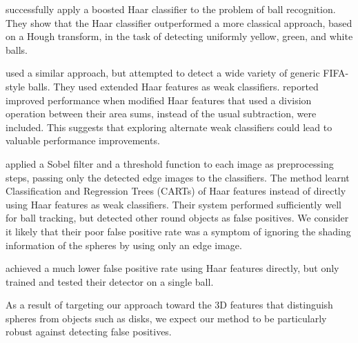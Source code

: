 \documentclass[11pt]{scrartcl}
\begin{document}
{        \citet{masselli2013haar} successfully apply a boosted Haar classifier
        \citep{viola2001robust} to the problem of ball recognition. They show
        that the Haar classifier outperformed a more classical approach, based on a
        Hough transform, in the task of detecting uniformly yellow, green, and white
        balls.

        \citet{zhang2013novel} used a similar approach, but attempted to
        detect a wide variety of generic FIFA-style balls. They used extended
        Haar features \citep{Lienhart2002extended} as weak classifiers.
        \citeauthor{zhang2013novel} reported improved performance when modified Haar
        features that used a division operation between their area sums, instead of
        the usual subtraction, were included. This suggests that exploring alternate
        weak classifiers could lead to valuable performance improvements.

        \citet{mitri2004fast} applied a Sobel filter and a threshold function
        to each image as preprocessing steps, passing only the detected edge
        images to the classifiers. The method learnt Classification and
        Regression Trees (CARTs) of Haar features instead of directly using
        Haar features as weak classifiers. Their system performed sufficiently
        well for ball tracking, but detected other round objects as false
        positives. We consider it likely that their poor false positive rate
        was a symptom of ignoring the shading information of the spheres by
        using only an edge image.


        \citet{Treptow2004filter} achieved a much lower false positive rate
        using Haar features directly, but only trained and tested their
        detector on a single ball.



        As a result of targeting our approach toward the 3D features that
        distinguish spheres from objects such as disks, we expect our method
        to be particularly robust against detecting false positives.
	}
\end{document}

